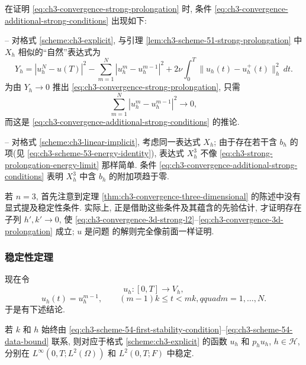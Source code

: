 {{在证明 \eqref{eq:ch3-convergence-strong-prolongation} 时, 条件 \eqref{eq:ch3-convergence-additional-strong-conditions} 出现如下:

-- 对格式 \ref{scheme:ch3-explicit}, 与引理 \ref{lem:ch3-scheme-51-strong-prolongation} 中 $X_h$ 相似的``自然''表达式为
\[
Y_h=|u_h^N-u(T)|^2-\sum_{m=1}^N|u_h^m-u_h^{m-1}|^2
+2\nu\int_0^T\lVert u_h(t)-u_h^+(t)\rVert_h^2\,dt.
\]
为由 $Y_h\to0$ 推出 \eqref{eq:ch3-convergence-strong-prolongation}, 只需
\[
\sum_{m=1}^N|u_h^m-u_h^{m-1}|^2\to0,
\]
而这是 \eqref{eq:ch3-convergence-additional-strong-conditions} 的推论.

-- 对格式 \ref{scheme:ch3-linear-implicit}, 考虑同一表达式 $X_h$; 由于存在若干含 $b_h$ 的项(见 \eqref{eq:ch3-scheme-53-energy-identity}), 表达式 $X_h^3$ 不像 \eqref{eq:ch3-strong-prolongation-energy-limit} 那样简单. 条件 \eqref{eq:ch3-convergence-additional-strong-conditions} 表明 $X_h^3$ 中含 $b_h$ 的附加项趋于零.

若 $n=3$, 首先注意到定理 \ref{thm:ch3-convergence-three-dimensional} 的陈述中没有显式提及稳定性条件. 实际上, 正是借助这些条件及其蕴含的先验估计, 才证明存在子列 $h',k'\to0$, 使 \eqref{eq:ch3-convergence-3d-strong-l2}--\eqref{eq:ch3-convergence-3d-prolongation} 成立; $u$ 是问题  的解则完全像前面一样证明.
}


\subsubsection{稳定性定理}
\label{subsubsec:ch3-scheme-54-stability-theorem}

现在令
\begin{equation}
u_h:[0,T]\longrightarrow V_h,
\label{eq:ch3-scheme-54-approximate-function}
\end{equation}
\begin{equation}
u_h(t)=u_h^{m-1},
\qquad(m-1)k\leq t<mk,qquad m=1,\ldots,N.
\label{eq:ch3-scheme-54-time-reconstruction}
\end{equation}
于是有下述结论.

\begin{Theorem}
\label{thm:ch3-scheme-54-stability}
若 $k$ 和 $h$ 始终由 \eqref{eq:ch3-scheme-54-first-stability-condition}--\eqref{eq:ch3-scheme-54-data-bound} 联系, 则对应于格式 \ref{scheme:ch3-explicit} 的函数 $u_h$ 和 $p_hu_h$, $h\in\mathcal H$, 分别在 $L^\infty(0,T;L^2(\Omega))$ 和 $L^2(0,T;F)$ 中稳定.
\end{Theorem}
}


